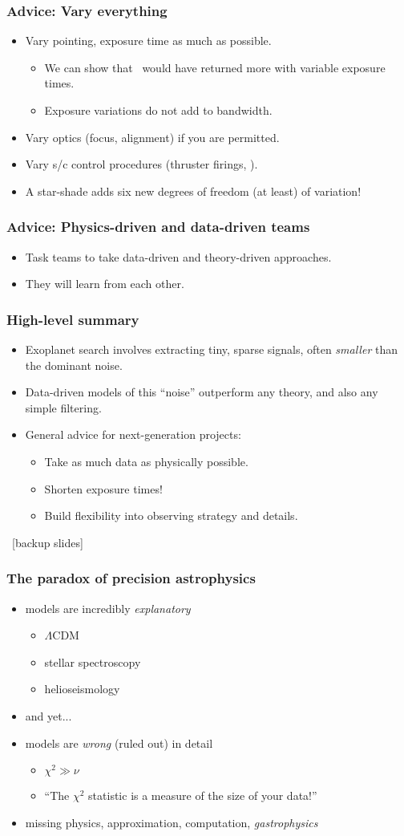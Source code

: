 \documentclass[pdftex]{beamer}
\newcommand{\conclusions}{%
\begin{frame}
  \frametitle{High-level summary}
  \begin{itemize}
  \item Exoplanet search involves extracting tiny, sparse signals, often \emph{smaller} than the dominant noise.
  \item Data-driven models of this ``noise'' outperform any theory, and also any simple filtering.
  \item General advice for next-generation projects:
    \begin{itemize}
    \item Take as much data as physically possible.
    \item Shorten exposure times!
    \item Build flexibility into observing strategy and details.
    \end{itemize}
  \end{itemize}
\end{frame}}
\begin{document}
\begin{frame}
  \frametitle{Advice: Vary everything}
  \begin{itemize}
  \item Vary pointing, exposure time as much as possible.
    \begin{itemize}
    \item We can show that \kepler\ would have returned more with variable exposure times.
    \item Exposure variations do not add to bandwidth.
    \end{itemize}
  \item Vary optics (focus, alignment) if you are permitted.
  \item Vary s/c control procedures (thruster firings, \etc).
  \item A star-shade adds six new degrees of freedom (at least) of variation!
  \end{itemize}
\end{frame}

\begin{frame}
  \frametitle{Advice: Physics-driven and data-driven teams}
  \begin{itemize}
  \item Task teams to take data-driven and theory-driven approaches.
  \item They will learn from each other.
  \end{itemize}
\end{frame}

\conclusions

\begin{frame}
~\hfill [backup slides] \hfill~
\end{frame}

\begin{frame}
  \frametitle{The paradox of precision astrophysics}
  \begin{itemize}
  \item models are incredibly \emph{explanatory}
    \begin{itemize}
    \item $\Lambda$CDM
    \item stellar spectroscopy
    \item helioseismology
    \end{itemize}
  \item and yet...
  \item<2-> models are \emph{wrong} (ruled out) in detail
    \begin{itemize}
    \item $\chi^2 \gg \nu$
    \item ``The $\chi^2$ statistic is a measure of the size of your data!''
    \end{itemize}
  \item<2-> missing physics, approximation, computation, \emph{gastrophysics}
  \end{itemize}
\end{frame}
\end{document}
